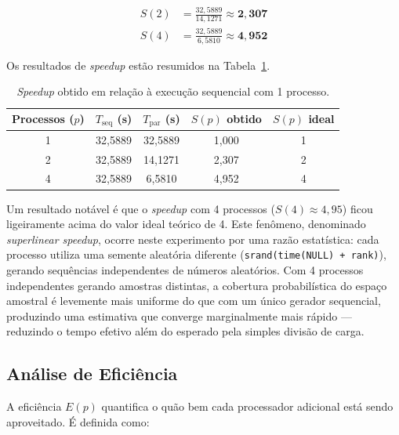 \documentclass[
	12pt,
	oneside,
	a4paper,
	chapter=TITLE,
	section=TITLE,
	english,
	brazil,
	sumario=tradicional
]{abntex2}
\begin{document}
\begin{align}
  S(2) &= \frac{32{,}5889}{14{,}1271} \approx \mathbf{2{,}307}
  \label{eq:s2} \\[6pt]
  S(4) &= \frac{32{,}5889}{6{,}5810}  \approx \mathbf{4{,}952}
  \label{eq:s4}
\end{align}
 
Os resultados de \textit{speedup} estão resumidos na
Tabela~\ref{tab:speedup}.

\begin{table}[htb]
    \centering
    \begin{tabular}{|c|c|c|c|c|}
        \hline
        \rowcolor{gray!25} 
        \textbf{Processos ($p$)} &
        \textbf{$T_{\text{seq}}$ (s)} &
        \textbf{$T_{\text{par}}$ (s)} &
        \textbf{$S(p)$ obtido} &
        \textbf{$S(p)$ ideal}  \\ 
        \hline
        1 & 32,5889 & 32,5889 & 1,000 & 1 \\
        \hline
        2 & 32,5889 & 14,1271 & 2,307 & 2 \\
        \hline
        4 & 32,5889 &  6,5810 & 4,952 & 4 \\
        \hline
    \end{tabular}
    \caption{\textit{Speedup} obtido em relação à execução sequencial
           com 1 processo.}
    \label{tab:speedup}
\end{table}
 
Um resultado notável é que o \textit{speedup} com 4 processos
($S(4) \approx 4{,}95$) ficou ligeiramente acima do
valor ideal teórico de 4. Este fenômeno, denominado
\textit{superlinear speedup}, ocorre neste experimento por uma
razão estatística: cada processo utiliza uma semente aleatória
diferente (\texttt{srand(time(NULL) + rank)}), gerando
sequências independentes de números aleatórios. Com 4 processos
independentes gerando amostras distintas, a cobertura
probabilística do espaço amostral é levemente mais uniforme do
que com um único gerador sequencial, produzindo uma estimativa
que converge marginalmente mais rápido — reduzindo o tempo
efetivo além do esperado pela simples divisão de carga.

\subsection{Análise de Eficiência}

A eficiência $E(p)$ quantifica o quão bem cada processador
adicional está sendo aproveitado. É definida como:
 
\end{document}
